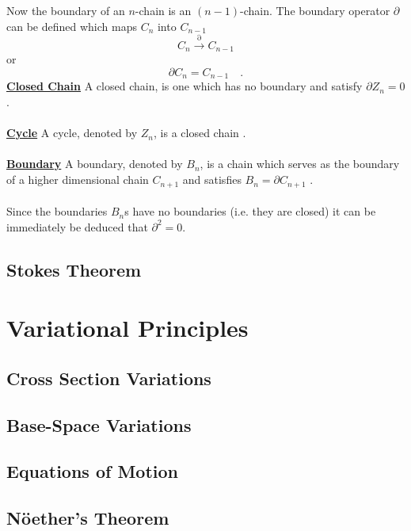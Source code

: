\documentclass[twocolumn]{article}
\def\.{{\quad .}}
\begin{document}
Now the boundary of an $n$-chain is an $(n-1)$-chain.  The boundary 
operator $\partial$ can be defined which maps $C_n$ into $C_{n-1}$
\[
  C_n \stackrel{\partial}{\rightarrow} C_{n-1}  
\]
or 
\[
  \partial C_n = C_{n-1} \.
\]
\noindent{$\bullet$}\underline{\textbf{Closed Chain}} A closed chain, 
is one which has no boundary and satisfy $\partial Z_n = 0$ 
\cite{ryder}. 
\\\\
\noindent{$\bullet$}\underline{\textbf{Cycle}} A cycle, denoted by 
$Z_n$, is 
a closed chain \cite{ryder}. 
\\\\
\noindent{$\bullet$}\underline{\textbf{Boundary}} A boundary, denoted 
by $B_n$, is a chain which serves as the boundary of a higher 
dimensional chain $C_{n+1}$ and satisfies $B_n = \partial C_{n+1}$ 
\cite{ryder}. 
\\\\
Since the boundaries $B_n$s have no boundaries (i.e. they are closed) 
it can be immediately be deduced that $\partial^2 = 0$.  

\subsection{Stokes Theorem}\label{SS:stokes}


\section{Variational Principles}\label{S:var_prin}

\subsection{Cross Section Variations}\label{SS:xsec_var}

\subsection{Base-Space Variations}\label{SS:base_var}

\subsection{Equations of Motion}\label{SS:eqn_mot}

\subsection{N\"{o}ether's Theorem}\label{SS:noether}
\end{document}
